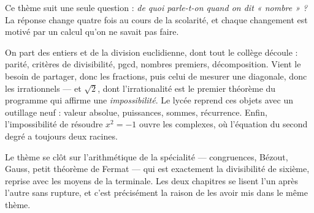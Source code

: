 Ce thème suit une seule question : \emph{de quoi parle-t-on quand on dit « nombre » ?} La
réponse change quatre fois au cours de la scolarité, et chaque changement est motivé par un
calcul qu'on ne savait pas faire.

On part des entiers et de la division euclidienne, dont tout le collège découle : parité,
critères de divisibilité, pgcd, nombres premiers, décomposition. Vient le besoin de partager,
donc les fractions, puis celui de mesurer une diagonale, donc les irrationnels — et
$\sqrt{2}$, dont l'irrationalité est le premier théorème du programme qui affirme une
\emph{impossibilité}. Le lycée reprend ces objets avec un outillage neuf : valeur absolue,
puissances, sommes, récurrence. Enfin, l'impossibilité de résoudre $x^2 = -1$ ouvre les
complexes, où l'équation du second degré a toujours deux racines.

Le thème se clôt sur l'arithmétique de la spécialité — congruences, Bézout, Gauss, petit
théorème de Fermat — qui est exactement la divisibilité de sixième, reprise avec les moyens
de la terminale. Les deux chapitres se lisent l'un après l'autre sans rupture, et c'est
précisément la raison de les avoir mis dans le même thème.
